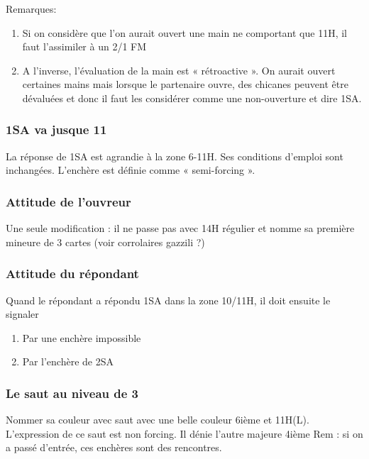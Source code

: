 \documentclass[a4paper]{article}
\begin{document}
Remarques:

\begin{enumerate}
\item Si on considère que l’on aurait ouvert une main ne comportant que 11H, il faut 
l’assimiler à un 2/1 FM

\item A l’inverse, l’évaluation de la main est « rétroactive ». On aurait ouvert certaines mains 
mais lorsque le partenaire ouvre, des chicanes peuvent être dévaluées et donc il faut les 
considérer comme une non-ouverture et dire 1SA.

\end{enumerate}

\subsubsection{1SA va jusque 11}

La réponse de 1SA est agrandie à la zone 6-11H. 
Ses conditions d’emploi sont inchangées. 
L’enchère est définie comme « semi-forcing ».

\subsubsection{Attitude de l'ouvreur}

Une seule modification : il ne passe pas avec 14H régulier et nomme sa 
première mineure de 3 cartes (voir corrolaires gazzili ?)

\subsubsection{Attitude du répondant}

Quand le répondant a répondu 1SA dans la zone 10/11H, il doit ensuite 
le signaler

\begin{enumerate}
\item Par une enchère impossible

\item Par l’enchère de 2SA

\end{enumerate}

\subsubsection{Le saut au niveau de 3}

Nommer sa couleur avec saut avec une belle couleur 6ième et 11H(L). 
L’expression de ce saut est non forcing. Il dénie l’autre majeure 4ième
Rem : si on a passé d’entrée, ces enchères sont des rencontres.
\end{document}
